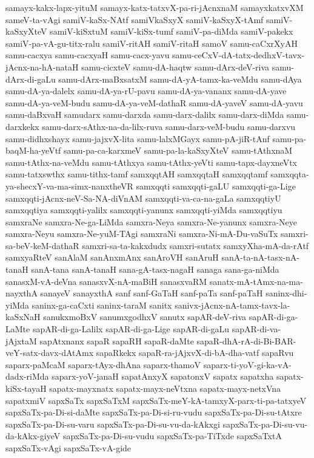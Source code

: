 {samayx-kakx-lapx-yituM
samayx-katx-tatxvX-pa-ri-jAcnxnaM
samayxkatxvXM
sameV-ta-vAgi
samiV-kaSx-NAtf
samiVkaSxyX
samiV-kaSxyX-tAmf
samiV-kaSxyXteV
samiV-kiSxtuM
samiV-kiSx-tumf
samiV-pa-diMda
samiV-pakekx
samiV-pa-vA-gu-titx-ralu
samiV-ritAH
samiV-ritaH
samoV
samu-caCxrXyAH
samu-cacxya
samu-cacxyaH
samu-cacx-yavu
samu-ceCxV-dA-tatx-dedhxV-tavx-jAcnx-na-hA-nataH
samu-cicxteV
samu-dA-haqtw
samu-dArx-deV-riva
samu-dArx-di-gaLu
samu-dArx-maBxsatxM
samu-dA-yA-tamx-ka-veMdu
samu-dAya
samu-dA-ya-dalelx
samu-dA-ya-rU-pavu
samu-dA-ya-vananx
samu-dA-yave
samu-dA-ya-veM-budu
samu-dA-ya-veM-dathaR
samu-dA-yaveV
samu-dA-yavu
samu-daBxvaH
samudarx
samu-darxda
samu-darx-dalilx
samu-darx-diMda
samu-darxkekx
samu-darx-sAthx-na-da-lilx-ruva
samu-darx-veM-budu
samu-darxvu
samu-didhxshayx
samu-jajxvX-lita
samu-lalxMGayx
samu-pA-jiR-tAnf
samu-pa-baqM-ha-yeVtf
samu-pa-ca-karxmeV
samu-pa-la-kaSxyXteV
samu-tAthxnaM
samu-tAthx-na-veMdu
samu-tAthxya
samu-tAthx-yeVti
samu-tapx-dayxneVtx
samu-tatxswthx
samu-tithx-tamf
samxqqtAH
samxqqtaH
samxqqtamf
samxqqta-ya-shecxY-va-ma-simx-nanxtheVR
samxqqti
samxqqti-gaLU
samxqqti-ga-Lige
samxqqti-jAcnx-neV-Sa-NA-diVnAM
samxqqti-va-ca-na-gaLa
samxqqtiyU
samxqqtiya
samxqqti-yalilx
samxqqti-yanunx
samxqqti-yiMda
samxqqtiyu
samxraNe
samxra-Ne-ga-LiMda
samxra-Neya
samxra-Ne-yanunx
samxra-Neye
samxra-Neyu
samxra-Ne-yuM-TAgi
samxraNi
samxra-Ni-mA-Du-vaSuTx
samxri-sa-beV-keM-dathaR
samxri-sa-ta-kakxdudx
samxri-sutatx
samxyXha-mA-da-rAtf
samxyaRteV
sanAlaM
sanAnxmAnx
sanAroVH
sanAruH
sanA-ta-nA-tasx-nA-tanaH
sanA-tana
sanA-tanaH
sana-gA-tasx-nagaH
sanaga
sana-ga-niMda
sanasxM-vA-deVna
sanasxvX-nA-maBiH
sanasxvaRM
sanatx-mA-tAmx-na-ma-nayxthA
sanayeV
sanayxthA
sanf
sanf-GaTaH
sanf-paTa
sanf-paTaH
saninx-dhi-yiMda
saninx-ga-caCxti
saninx-taraM
sanitx
sanivx-jAcnx-nA-tamx-tavx-la-kaSxNaH
sanukxmoBxV
sanumxgodhxV
sanutx
sapAR-deV-riva
sapAR-di-ga-LaMte
sapAR-di-ga-Lalilx
sapAR-di-ga-Lige
sapAR-di-gaLu
sapAR-di-va-jAjxtaM
sapAtxnanx
sapaR
sapaRH
sapaR-daMte
sapaR-dhA-rA-di-Bi-BAR-veY-satx-davx-dAtAmx
sapaRkekx
sapaR-ra-jAjxvX-di-bA-dha-vatf
sapaRvu
saparx-paMcaM
saparx-tAyx-dhAna
saparx-thamoV
saparx-ti-yoV-gi-ka-vA-dadx-riMda
saparx-yoV-janaH
sapatAnxyX
sapatonxV
sapatx
sapatxha
sapatx-kiSx-tayaH
sapatx-mayxnatx
sapatx-mayx-neVtxna
sapatx-mayx-netxVna
sapatxmiV
sapxSaTx
sapxSaTxM
sapxSaTx-meY-kA-tamxyX-parx-ti-pa-tatxyeV
sapxSaTx-pa-Di-si-daMte
sapxSaTx-pa-Di-si-ru-vudu
sapxSaTx-pa-Di-su-tAtxre
sapxSaTx-pa-Di-su-varu
sapxSaTx-pa-Di-su-vu-da-kAkxgi
sapxSaTx-pa-Di-su-vu-da-kAkx-giyeV
sapxSaTx-pa-Di-su-vudu
sapxSaTx-pa-TiTxde
sapxSaTxtA
sapxSaTx-vAgi
sapxSaTx-vA-gide
}
